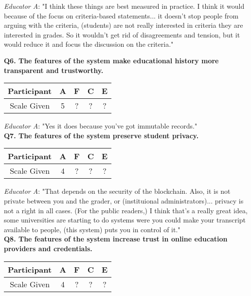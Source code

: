 \textit{Educator A}: "I think these things are best measured in practice. I think it would because of the focus on 
criteria-based statements... it doesn't stop people from arguing with the criteria, (students) are not really interested 
in criteria they are interested in grades. So it wouldn't get rid of disagreements and tension, but it would reduce it 
and focus the discussion on the criteria."

\textbf{Q6. The features of the system make educational history more transparent and trustworthy.}\\
\begin{table}[!ht] 
    \centering
    \begin{tabularx}{0.325\textwidth}{|c|c|c|c|c|}
        \hline
        Participant & A & F & C & E \\
        \hline
        Scale Given & 5 & ? & ? & ? \\
        \hline
    \end{tabularx}
\end{table}

\textit{Educator A}: "Yes it does because you've got immutable records."\\

\textbf{Q7. The features of the system preserve student privacy.}\\
\begin{table}[!ht] 
    \centering
    \begin{tabularx}{0.325\textwidth}{|c|c|c|c|c|}
        \hline
        Participant & A & F & C & E \\
        \hline
        Scale Given & 4 & ? & ? & ? \\
        \hline
    \end{tabularx}
\end{table}

\textit{Educator A}: "That depends on the security of the blockchain. Also, it is not private between you and 
the grader, or (instituional administrators)... privacy is not a right in all cases. (For the public readers,) 
I think that's a really great idea, some universities are starting to do systems were you could make your transcript 
available to people, (this system) puts you in control of it."\\

\textbf{Q8. The features of the system increase trust in online education providers and credentials.}\\
\begin{table}[!ht] 
    \centering
    \begin{tabularx}{0.325\textwidth}{|c|c|c|c|c|}
        \hline
        Participant & A & F & C & E \\
        \hline
        Scale Given & 4 & ? & ? & ? \\
        \hline
    \end{tabularx}
\end{table}

